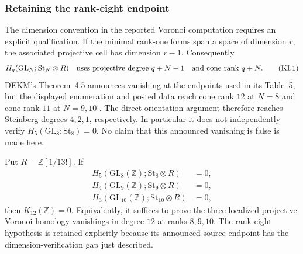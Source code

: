 \subsubsection{Retaining the rank-eight endpoint}
\label{sec:k12-index-safe}

The dimension convention in the reported Voronoi computation requires
an explicit qualification.  If the minimal rank-one forms span a space
of dimension $r$, the associated projective cell has dimension $r-1$.
Consequently
\[
 H_q(\mathrm{GL}_N;\mathrm{St}_N\otimes R)
 \quad\hbox{uses projective degree }q+N-1
 \quad\hbox{and cone rank }q+N.
 \tag{KI.1}
\]
DEKM's Theorem~4.5 announces vanishing at the endpoints used in its
Table~5, but the displayed enumeration and posted data reach cone rank
$12$ at $N=8$ and cone rank $11$ at $N=9,10$
\cite[\S\S1.1--1.2, Definition~2.1, Tables~3--4,
Theorem~4.5]{DEKM2026}.
The direct orientation argument therefore reaches Steinberg degrees
$4,2,1$, respectively.  In particular it does not independently verify
$H_5(\mathrm{GL}_8;\mathrm{St}_8)=0$.
No claim that this announced vanishing is false is made here.

\begin{proposition}
\label{prop:k12-three-ranks}
Put $R=\mathbb Z[1/13!]$.  If
\[
\begin{split}
 H_5(\mathrm{GL}_8(\mathbb Z);\mathrm{St}_8\otimes R)&=0,\\
 H_4(\mathrm{GL}_9(\mathbb Z);\mathrm{St}_9\otimes R)&=0,\\
 H_3(\mathrm{GL}_{10}(\mathbb Z);\mathrm{St}_{10}\otimes R)&=0,
\end{split}                                                     \tag{KI.2}
\]
then $K_{12}(\mathbb Z)=0$.
Equivalently, it suffices to prove the three localized projective
Voronoi homology vanishings in degree $12$ at ranks $8,9,10$.
The rank-eight hypothesis is retained explicitly because its announced
source endpoint has the dimension-verification gap just described.
\end{proposition}

